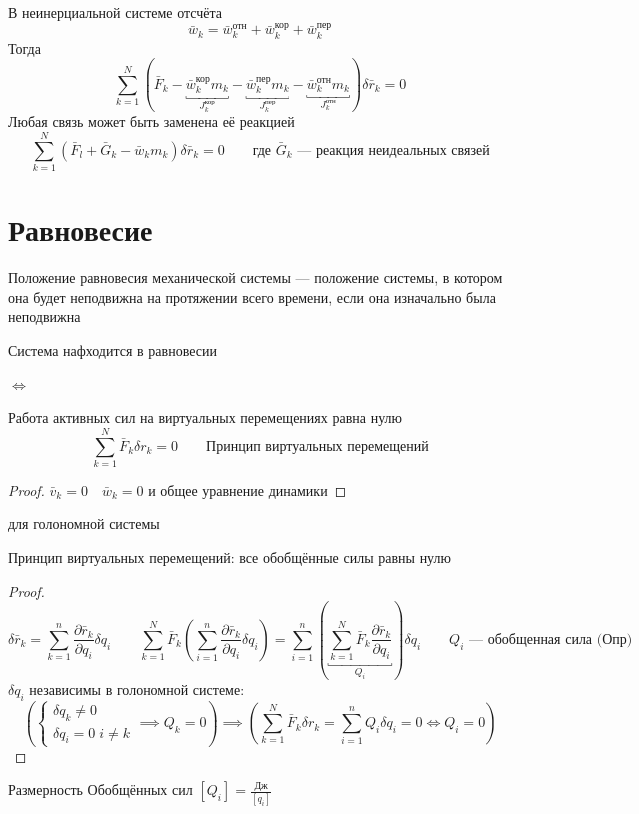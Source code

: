 \documentclass[crop=false]{standalone}
\begin{document}
\noindent \keypoint В неинерциальной системе отсчёта
\[
\bar w_k = \bar w_k^{\text{отн}} + \bar w_k^{\text{кор}} + \bar w_k^{\text{пер}}\]
Тогда 
\[\sum_{k=1}^{N} \left( \bar F_k - \underbracket{\bar w_k^{\text{кор}} m_k}_{J_k^{\text{кор}}} - \underbracket{\bar w_k^{\text{пер}} m_k}_{J_k^{\text{пер}}} - \underbracket{\bar w_k^{\text{отн}} m_k}_{J_k^\text{отн}} \right) \delta \bar r_k = 0\]
\keypoint Любая связь может быть заменена её реакцией
\[\sum_{k=1}^{N} \left(\bar F_l + \bar G_k - \bar w_k m_k \right) \delta \bar r_k =0 \qquad \text{где }\bar G_k \text{ — реакция неидеальных связей}\]

\section{Равновесие}
\Def Положение равновесия механической системы — положение системы, в котором она будет неподвижна на протяжении всего времени, если она изначально была неподвижна


\noindent \keypoint

Система нафходится в равновесии 

$\iff$

Работа активных сил на виртуальных перемещениях равна нулю
\[\boxed{\sum_{k=1}^{N} \bar F_k \delta r_k = 0} \qquad \text{Принцип виртуальных перемещений}\]
\begin{proof}
    $\bar v_k = 0 \quad \bar w_k = 0$ и общее уравнение динамики
\end{proof}

\noindent \keypoint

для голономной системы

Принцип виртуальных перемещений: все обобщённые силы равны нулю
\begin{proof}
    \[
        \delta \bar r_k = \sum_{k=1}^{n} \frac{\partial \bar r_k}{\partial q_i
        } \delta q_i 
        \qquad
        \sum_{k=1}^{N} \bar F_k \left(\sum_{i=1}^{n} \frac{\partial \bar r_k}{\partial q_i
        } \delta q_i \right) = \sum_{i=1}^{n} \left(\underbracket{\sum_{k=1}^{N} \bar F_k \frac{\partial \bar r_k}{\partial q_i}}_{Q_i}\right) \delta q_i \qquad Q_i \text{ — обобщенная сила (Опр)}\]
        $\delta q_i$ независимы в голономной системе:
        \[\left(\begin{cases}
                \delta q_k \neq 0 \\
                \delta q_i = 0 \; i \neq k
            \end{cases}
            \implies Q_k = 0\right) \implies \left(\sum_{k=1}^{N} \bar F_k \delta r_k = \sum_{i=1}^{n} Q_i \delta q_i =0 \iff Q_i = 0\right)\]
\end{proof}
            

\noindent \keypoint Размерность Обобщённых сил
$\left[ Q_i\right] = \frac{\text{Дж}}{\left[q_i \right]}$
\end{document}
